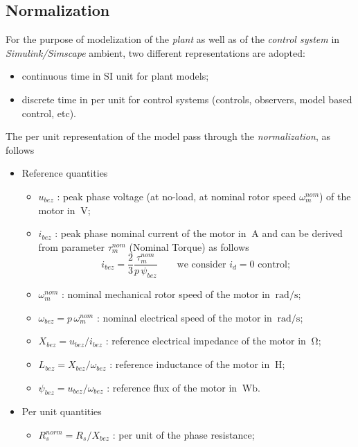 \documentclass[12pt,a4paper]{scrartcl}
\begin{document}
\begin{onehalfspace}
\subsection{Normalization}	
For the purpose of modelization of the \textit{plant} as well as of the \textit{control system} in \textit{Simulink/Simscape} ambient, two different representations are adopted:
\begin{itemize}
	\item[--] continuous time in SI unit for plant models;
	\item[--] discrete time in per unit for control systems (controls, observers, model based control, etc).	
\end{itemize}

The per unit representation of the model pass through the \textit{normalization}, as follows
\begin{itemize}
	\item[--] Reference quantities
	\begin{itemize}
		\item[--] $u_{bez}$ : peak phase voltage (at no-load, at nominal rotor speed $\omega_m^{nom}$) of the motor in $\SI{}{\volt}$;
		\item[--] $i_{bez}$ : peak phase nominal current of the motor in $\SI{}{\ampere}$ and can be derived from parameter $\tau_m^{nom}$ (Nominal Torque) as follows
		\begin{equation}
			i_{bez} = \frac{2}{3}\frac{\tau_m^{nom}}{p\,\psi_{bez}} \qquad\text{we consider $i_d=0$ control};
		\end{equation}
		\item[--] $\omega_m^{nom}$ : nominal mechanical rotor speed of the motor in $\SI{}{\radian\per\second}$;
		\item[--] $\omega_{bez} = p\,\omega_m^{nom}$ : nominal electrical speed of the motor in $\SI{}{\radian\per\second}$;
		\item[--] $X_{bez} = u_{bez}/i_{bez}$ : reference electrical impedance of the motor in $\SI{}{\ohm}$;
		\item[--] $L_{bez} = X_{bez}/\omega_{bez}$ : reference inductance of the motor in $\SI{}{\henry}$;
		\item[--] $\psi_{bez} = u_{bez}/\omega_{bez}$ : reference flux of the motor in $\SI{}{\weber}$.
	\end{itemize}
	\item[--] Per unit quantities
	\begin{itemize}
		\item[--] $R_s^{norm} = R_s/X_{bez}$ : per unit of the phase resistance;

\end{itemize}
\end{itemize}
\end{onehalfspace}
\end{document}
